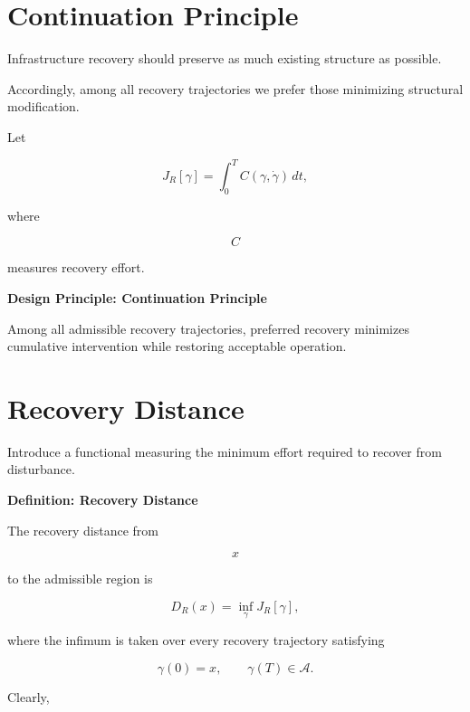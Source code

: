 \documentclass[11pt,fleqn]{book}
\numberwithin{equation}{chapter}
\newenvironment{definition}[1]
  {\begin{definitionEnv}
   \noindent\textbf{Definition: #1}\par\smallskip}
  {\end{definitionEnv}}
\newenvironment{principle}[1]
  {\begin{principleEnv}
   \noindent\textbf{Design Principle: #1}\par\smallskip\itshape}
  {\end{principleEnv}}
\theoremstyle{plain}
\theoremstyle{definition}
\theoremstyle{remark}
\begin{document}
\section{Continuation Principle}

Infrastructure recovery should preserve as much existing structure as
possible.

Accordingly, among all recovery trajectories we prefer those minimizing
structural modification.

Let

\[
J_R[\gamma]
=
\int_0^T
C(\gamma,\dot\gamma)\,dt,
\]

where

\[
C
\]

measures recovery effort.


\begin{principle}{Continuation Principle}

Among all admissible recovery trajectories, preferred recovery minimizes
cumulative intervention while restoring acceptable operation.

\end{principle}


\section{Recovery Distance}

Introduce a functional measuring the minimum effort required to recover
from disturbance.


\begin{definition}{Recovery Distance}

The recovery distance from

\[
x
\]

to the admissible region is

\[
\boxed{
D_R(x)
=
\inf_{\gamma}
J_R[\gamma],
}
\]

where the infimum is taken over every recovery trajectory satisfying

\[
\gamma(0)=x,
\qquad
\gamma(T)\in\mathcal A.
\]

\end{definition}

Clearly,
\end{document}
